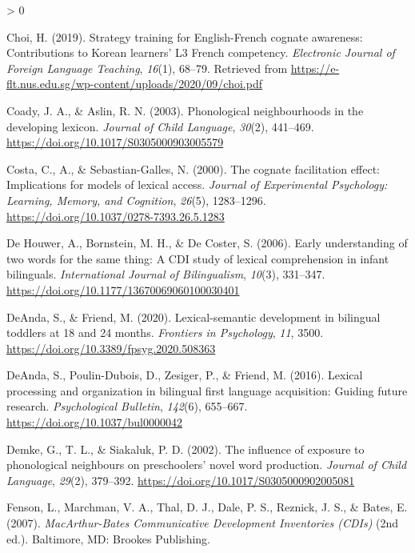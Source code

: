 \documentclass[
  english,
  ,man,floatsintext]{apa6}
\newlength{\cslhangindent}
\newenvironment{CSLReferences}[2] %
 {%
  \setlength{\parindent}{0pt}
  \ifodd #1 \everypar{\setlength{\hangindent}{\cslhangindent}}\ignorespaces\fi
  \ifnum #2 > 0
  \setlength{\parskip}{#2\baselineskip}
  \fi
 }%
 {}
\begin{document}
\begin{CSLReferences}{1}{0}
\leavevmode\hypertarget{ref-Choi_2019}{}%
Choi, H. (2019). Strategy training for {E}nglish-{F}rench cognate awareness: Contributions to {K}orean learners' L3 {F}rench competency. \emph{Electronic Journal of Foreign Language Teaching}, \emph{16}(1), 68--79. Retrieved from \url{https://e-flt.nus.edu.sg/wp-content/uploads/2020/09/choi.pdf}

\leavevmode\hypertarget{ref-Cody_Aslin_2003}{}%
Coady, J. A., \& Aslin, R. N. (2003). Phonological neighbourhoods in the developing lexicon. \emph{Journal of Child Language}, \emph{30}(2), 441--469. \url{https://doi.org/10.1017/S0305000903005579}

\leavevmode\hypertarget{ref-Costa_etal_2000}{}%
Costa, C., A., \& Sebastian-Galles, N. (2000). The cognate facilitation effect: Implications for models of lexical access. \emph{Journal of Experimental Psychology: Learning, Memory, and Cognition}, \emph{26}(5), 1283--1296. \url{https://doi.org/10.1037/0278-7393.26.5.1283}

\leavevmode\hypertarget{ref-DeHouwer_etal_2006}{}%
De Houwer, A., Bornstein, M. H., \& De Coster, S. (2006). Early understanding of two words for the same thing: A {CDI} study of lexical comprehension in infant bilinguals. \emph{International Journal of Bilingualism}, \emph{10}(3), 331--347. \url{https://doi.org/10.1177/13670069060100030401}

\leavevmode\hypertarget{ref-DeAnda_Friend_2020}{}%
DeAnda, S., \& Friend, M. (2020). Lexical-semantic development in bilingual toddlers at 18 and 24 months. \emph{Frontiers in Psychology}, \emph{11}, 3500. \url{https://doi.org/10.3389/fpsyg.2020.508363}

\leavevmode\hypertarget{ref-DeAnda_etal_2016}{}%
DeAnda, S., Poulin-Dubois, D., Zesiger, P., \& Friend, M. (2016). Lexical processing and organization in bilingual first language acquisition: Guiding future research. \emph{Psychological Bulletin}, \emph{142}(6), 655--667. \url{https://doi.org/10.1037/bul0000042}

\leavevmode\hypertarget{ref-Demke_etal_2002}{}%
Demke, G., T. L., \& Siakaluk, P. D. (2002). The influence of exposure to phonological neighbours on preschoolers' novel word production. \emph{Journal of Child Language}, \emph{29}(2), 379--392. \url{https://doi.org/10.1017/S0305000902005081}

\leavevmode\hypertarget{ref-Fenson_etal_2007}{}%
Fenson, L., Marchman, V. A., Thal, D. J., Dale, P. S., Reznick, J. S., \& Bates, E. (2007). \emph{MacArthur-{B}ates {C}ommunicative {D}evelopment {I}nventories ({CDIs})} (2nd ed.). Baltimore, MD: Brookes Publishing.


\end{CSLReferences}
\end{document}
